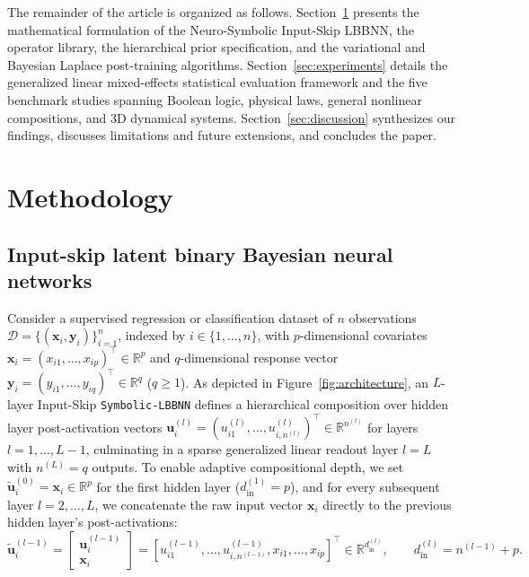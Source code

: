 \documentclass[11pt,a4paper]{article}
\begin{document}
The remainder of the article is organized as follows. Section~\ref{sec:methods} presents the mathematical formulation of the Neuro-Symbolic Input-Skip LBBNN, the operator library, the hierarchical prior specification, and the variational and Bayesian Laplace post-training algorithms. Section~\ref{sec:experiments} details the generalized linear mixed-effects statistical evaluation framework and the five benchmark studies spanning Boolean logic, physical laws, general nonlinear compositions, and 3D dynamical systems. Section~\ref{sec:discussion} synthesizes our findings, discusses limitations and future extensions, and concludes the paper.

\section{Methodology}
\label{sec:methods}

\subsection{Input-skip latent binary Bayesian neural networks}
\label{sec:methods:arch}

Consider a supervised regression or classification dataset of $n$ observations $\mathcal{D} = \{(\bm{x}_i, \bm{y}_i)\}_{i=1}^n$, indexed by $i \in \{1, \dots, n\}$, with $p$-dimensional covariates $\bm{x}_i = (x_{i1}, \dots, x_{ip})^\top \in \mathbb{R}^p$ and $q$-dimensional response vector $\bm{y}_i = (y_{i1}, \dots, y_{iq})^\top \in \mathbb{R}^q$ ($q \ge 1$). As depicted in Figure~\ref{fig:architecture}, an $L$-layer Input-Skip \texttt{Symbolic-LBBNN} \citep{skaaret2024input, skaaret2026lbbnn} defines a hierarchical composition over hidden layer post-activation vectors $\bm{u}_i^{(l)} = (u_{i1}^{(l)}, \dots, u_{i,n^{(l)}}^{(l)})^\top \in \mathbb{R}^{n^{(l)}}$ for layers $l = 1, \dots, L-1$, culminating in a sparse generalized linear readout layer $l = L$ with $n^{(L)} = q$ outputs. To enable adaptive compositional depth, we set $\tilde{\bm{u}}_i^{(0)} = \bm{x}_i \in \mathbb{R}^p$ for the first hidden layer ($d_{\text{in}}^{(1)} = p$), and for every subsequent layer $l = 2, \dots, L$, we concatenate the raw input vector $\bm{x}_i$ directly to the previous hidden layer's post-activations:
\begin{equation}
\label{eq:input_skip_concat}
\tilde{\bm{u}}_i^{(l-1)} = \begin{bmatrix} \bm{u}_i^{(l-1)} \\ \bm{x}_i \end{bmatrix} = \left[u_{i1}^{(l-1)}, \dots, u_{i,n^{(l-1)}}^{(l-1)}, x_{i1}, \dots, x_{ip}\right]^\top \in \mathbb{R}^{d_{\text{in}}^{(l)}}, \qquad d_{\text{in}}^{(l)} = n^{(l-1)} + p.
\end{equation}
\end{document}
